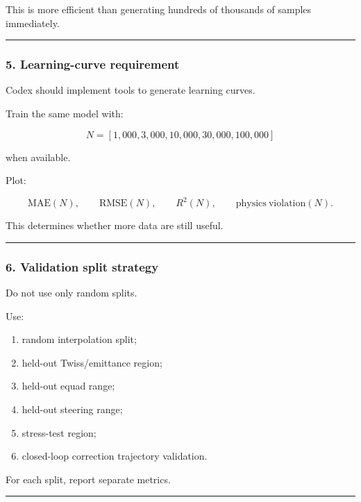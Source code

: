 \documentclass[
]{article}
\providecommand{\tightlist}{%
  \setlength{\itemsep}{0pt}\setlength{\parskip}{0pt}}
\begin{document}
This is more efficient than generating hundreds of thousands of samples
immediately.

\begin{center}\rule{0.5\linewidth}{0.5pt}\end{center}

\hypertarget{learning-curve-requirement}{%
\subsubsection{5. Learning-curve
requirement}\label{learning-curve-requirement}}

Codex should implement tools to generate learning curves.

Train the same model with:

\[
N =
[
1{,}000,
3{,}000,
10{,}000,
30{,}000,
100{,}000
]
\]

when available.

Plot:

\[
\mathrm{MAE}(N),
\qquad
\mathrm{RMSE}(N),
\qquad
R^2(N),
\qquad
\mathrm{physics\ violation}(N).
\]

This determines whether more data are still useful.

\begin{center}\rule{0.5\linewidth}{0.5pt}\end{center}

\hypertarget{validation-split-strategy}{%
\subsubsection{6. Validation split
strategy}\label{validation-split-strategy}}

Do not use only random splits.

Use:

\begin{enumerate}
\def\labelenumi{\arabic{enumi}.}
\tightlist
\item
  random interpolation split;
\item
  held-out Twiss/emittance region;
\item
  held-out equad range;
\item
  held-out steering range;
\item
  stress-test region;
\item
  closed-loop correction trajectory validation.
\end{enumerate}

For each split, report separate metrics.

\begin{center}\rule{0.5\linewidth}{0.5pt}\end{center}
\end{document}
